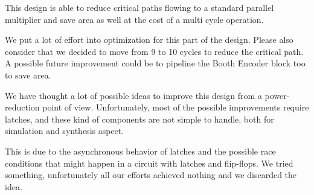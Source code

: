 \documentclass[12pt]{article}
\begin{document}
This design is able to reduce critical paths flowing to a standard parallel multiplier and save area as well at the cost of a multi cycle operation. 

We put a lot of effort into optimization for this part of the design. Please also consider that we decided to move from 9 to 10 cycles to reduce the critical path.
A possible future improvement could be to pipeline the Booth Encoder block too to save area.

We have thought a lot of possible ideas to improve this design from a power-reduction point of view. Unfortunately, most of the possible improvements require latches, and these kind of components are not simple to handle, both for simulation and synthesis aspect.

This is due to the asynchronous behavior of latches and the possible race conditions that might happen in a circuit with latches and flip-flops. We tried something, unfortunately all our efforts achieved nothing and we discarded the idea.
\end{document}
